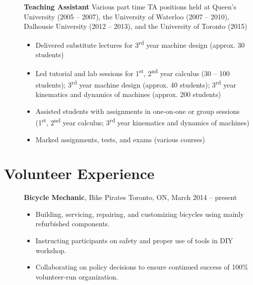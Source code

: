 \documentclass[10pt]{article}
\newcommand{\ts}{\textsuperscript}
\begin{document}
\begin{description}

\item[] \textbf{Teaching Assistant}\newline{}%
Various part time TA positions held at Queen's University (2005 -- 2007), the University of Waterloo (2007 -- 2010), Dalhousie University (2012 -- 2013), and the University of Toronto (2015)
\begin{itemize}
\item Delivered substitute lectures for 3\ts{rd} year machine design (approx. 30 students)
\item Led tutorial and lab sessions for 1\ts{st}, 2\ts{nd} year calculus (30 -- 100 students); 3\ts{rd} year machine design (approx. 40 students); 3\ts{rd} year kinematics and dynamics of machines (approx. 200 students)
\item Assisted students with assignments in one-on-one or group sessions (1\ts{st}, 2\ts{nd}  year calculus; 3\ts{rd} year kinematics and dynamics of machines)
\item Marked assignments, tests, and exams (various courses)
\end{itemize}
\end{description}


\section*{Volunteer Experience}

\begin{description}

\item[] \textbf{Bicycle Mechanic}, Bike Pirates\newline{}%
Toronto, ON, March 2014 -- present
\begin{itemize}
\item Building, servicing, repairing, and customizing bicycles using mainly refurbished components.
\item Instructing participants on safety and proper use of tools in DIY workshop.
\item Collaborating on policy decisions to ensure continued success of 100\% volunteer-run organization.
\end{itemize}

\end{description}
\end{document}
